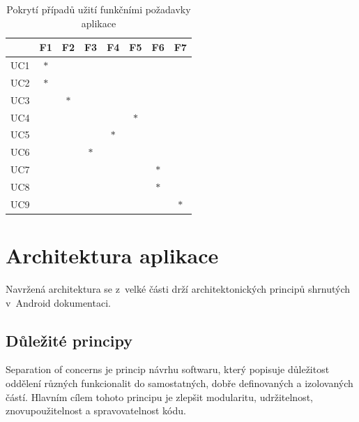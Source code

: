 \begin{table}[H]
  \centering
  \begin{tabular}{|l|c|c|c|c|c|c|c|}
  \hline
       & F1     & F2     & F3     & F4     & F5     & F6     & F7  \\ \hline
  UC1  & $\ast$ &        &        &        &        &        &         \\ \hline
  UC2  & $\ast$ &        &        &        &        &        &         \\ \hline
  UC3  &        & $\ast$ &        &        &        &        &         \\ \hline
  UC4  &        &        &        &        & $\ast$ &        &         \\ \hline
  UC5  &        &        &        & $\ast$ &        &        &         \\ \hline
  UC6  &        &        & $\ast$ &        &        &        &         \\ \hline
  UC7  &        &        &        &        &        & $\ast$ &         \\ \hline
  UC8  &        &        &        &        &        & $\ast$ &         \\ \hline
  UC9  &        &        &        &        &        &        &  $\ast$ \\ \hline
  \end{tabular}
  \caption{Pokrytí případů užití funkčními požadavky aplikace}
  \label{table:tabulkaPokryti}
\end{table}
  

\section{Architektura aplikace}
Navržená architektura se z~velké části drží architektonických principů shrnutých v~Android dokumentaci.


\subsection*{Důležité principy}

Separation of concerns je princip návrhu softwaru, který popisuje důležitost oddělení různých funkcionalit do samostatných, dobře definovaných a izolovaných částí. \cite{sapSep}
Hlavním cílem tohoto principu je zlepšit modularitu, udržitelnost, znovupoužitelnost a spravovatelnost kódu.

